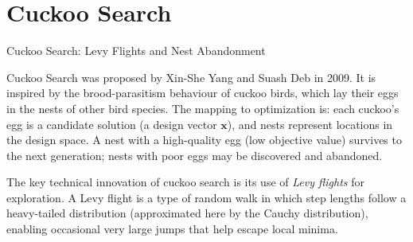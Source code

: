 \documentclass[aspectratio=169,10pt]{beamer}
\newcommand{\bx}{\mathbf{x}}
\begin{document}
\section{Cuckoo Search}

\begin{frame}[allowframebreaks]{Cuckoo Search: Levy Flights and Nest Abandonment}

  Cuckoo Search was proposed by Xin-She Yang and Suash Deb in 2009.
  It is inspired by the brood-parasitism behaviour of cuckoo birds,
  which lay their eggs in the nests of other bird species.  The
  mapping to optimization is: each cuckoo's egg is a candidate
  solution (a design vector $\bx$), and nests represent locations in
  the design space.  A nest with a high-quality egg (low objective
  value) survives to the next generation; nests with poor eggs may
  be discovered and abandoned.

  The key technical innovation of cuckoo search is its use of
  \emph{Levy flights} for exploration.  A Levy flight is a type of
  random walk in which step lengths follow a heavy-tailed
  distribution (approximated here by the Cauchy distribution),
  enabling occasional very large jumps that help escape local minima.


\end{frame}
\end{document}
